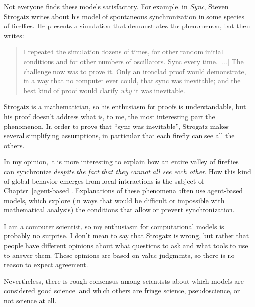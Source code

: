 \documentclass[12pt]{book}
\theoremstyle{exercise}
\begin{document}
Not everyone finds these models satisfactory.  For example, in
{\em Sync}, Steven Strogatz writes about his model of spontaneous
synchronization in some species of fireflies.  He presents a
simulation that demonstrates the phenomenon, but then writes:


\begin{quote}
I repeated the simulation dozens of times, for other random
initial conditions and for other numbers of oscillators.  Sync
every time. [...] The challenge now was to prove it.  Only an
ironclad proof would demonstrate, in a way that no computer ever
could, that sync was inevitable; and the best kind of proof would
clarify {\em why} it was inevitable.
\end{quote}

Strogatz is a mathematician, so his enthusiasm for proofs is
understandable, but his proof doesn't address what is, to me, the
most interesting part the phenomenon.  In order to prove that ``sync
was inevitable'', Strogatz makes several simplifying assumptions, in
particular that each firefly can see all the others.


In my opinion, it is more interesting to explain how an entire valley
of fireflies can synchronize {\em despite the fact that they cannot
  all see each other}.  How this kind of global behavior emerges from
local interactions is the subject of Chapter~\ref{agent-based}.
Explanations of these phenomena often use agent-based models, which
explore (in ways that would be difficult or impossible with
mathematical analysis) the conditions that allow or prevent
synchronization.

I am a computer scientist, so my enthusiasm for computational models
is probably no surprise.  I don't mean to say that Strogatz is wrong,
but rather that people have different opinions about what questions to
ask and what tools to use to answer them.  These opinions are based
on value judgments, so there is no reason to expect agreement.


Nevertheless, there is rough consensus among scientists
about which models are considered good science, and which others
are fringe science, pseudoscience, or not science at all.

\end{document}
